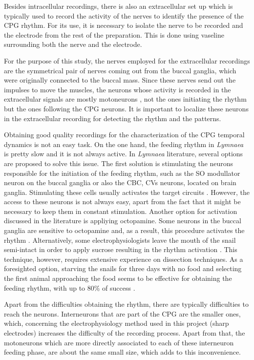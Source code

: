 Besides intracellular recordings, there is also an extracellular set up which is typically used to record the activity of the nerves to identify the presence of the CPG rhythm. For its use, it is necessary to isolate the nerve to be recorded and the electrode from the rest of the preparation. This is done using vaseline surrounding both the nerve and the electrode. 

For the purpose of this study, the nerves employed for the extracellular recordings are the symmetrical pair of nerves coming out from the buccal ganglia, which were originally connected to the buccal mass. Since these nerves send out the impulses to move the muscles, the neurons whose activity is recorded in the extracellular signals are mostly motoneurons \cite{Benjamin1979a}, not the ones initiating the rhythm but the ones following the CPG neurons. It is important to localize these neurons in the extracellular recording for detecting the rhythm and the patterns. 

Obtaining good quality recordings for the characterization of the CPG temporal dynamics is not an easy task. On the one hand, the feeding rhythm in \textit{Lymnaea} is pretty slow and it is not always active. In \textit{Lymnaea} literature, several options are proposed to solve this issue. The first solution is stimulating the neurons responsible for the initiation of the feeding rhythm, such as the SO modullator neuron on the buccal ganglia or also the CBC, CVs neurons, located on brain ganglia. Stimulating these cells usually activates the target circuits \cite{Benjamin2012}. However, the access to these neurons is not always easy, apart from the fact that it might be necessary to keep them in constant stimulation. 
Another option for activation discussed in the literature is appliying octopamine. Some neurons in the buccal ganglia are sensitive to octopamine and, as a result, this procedure activates the rhythm \cite{Vehovszky2004}. 
Alternatively, some electrophysiologists leave the mouth of the snail semi-intact in order to apply sucrose resulting in the rhythm activation \cite{Vavoulis2007,Vehovszky2004,Straub2002}. This technique, however, requires extensive experience on dissection techniques. 
As a foresighted option, starving the snails for three days with no food and selecting the first animal approaching the food seems to be effective for obtaining the feeding rhythm, with up to 80\% of success \cite{Elliott1991}.

Apart from the difficulties obtaining the rhythm, there are typically difficulties to reach the neurons. Interneurons that are part of the CPG are the smaller ones, which, concerning the electrophysiology method used in this project (sharp electrodes) increases the difficulty of the recording process. Apart from that, the motoneurons which are more directly associated to each of these interneuron feeding phase, are about the same small size, which adds to this inconvenience. 

